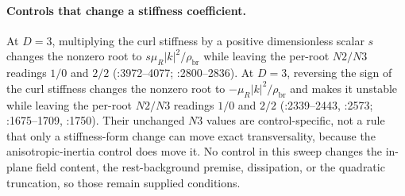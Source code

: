 \paragraph{Controls that change a stiffness coefficient.}
At \(D=3\), multiplying the curl stiffness by a positive dimensionless scalar
\(s\) changes the nonzero root to \(s\mu_R|k|^2/\rho_{\mathrm{br}}\) while
leaving the per-root \(N2/N3\) readings \(1/0\) and \(2/2\)
(:3972--4077;
:2800--2836).
At \(D=3\), reversing the sign of the curl stiffness changes the nonzero root
to \(-\mu_R|k|^2/\rho_{\mathrm{br}}\) and makes it unstable while leaving the
per-root \(N2/N3\) readings \(1/0\) and \(2/2\)
(:2339--2443,
:2573;
:1675--1709,
:1750).
Their unchanged \(N3\) values are control-specific, not a rule that only a
stiffness-form change can move exact transversality, because the
anisotropic-inertia control does move it.
No control in this sweep changes the in-plane field content, the rest-background
premise, dissipation, or the quadratic truncation, so those remain supplied
conditions.

